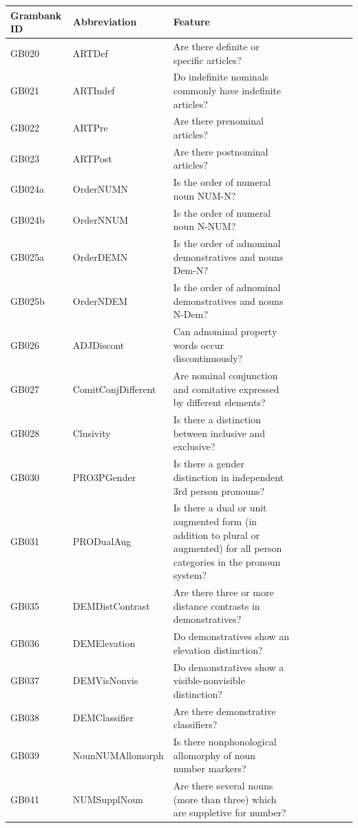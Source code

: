 \documentclass[draft,10pt]{article} %
\begin{document}
\begin{landscape}
\begin{longtable}{| l | p{4cm}| p{12cm}|p{2cm}|p{2cm}|p{2cm}|p{2cm}|p{2cm}|p{2cm}|}
\hline
\textbf{Grambank ID} & \textbf{Abbreviation} & \textbf{Feature}\\ \hline
\endhead
GB020 & ARTDef&Are there definite or specific articles?\\ \hline
GB021 & ARTIndef&Do indefinite nominals commonly have indefinite articles?\\ \hline
GB022 & ARTPre&Are there prenominal articles?\\ \hline
GB023 & ARTPost&Are there postnominal articles?\\ \hline
GB024a & OrderNUMN&Is the order of numeral noun NUM-N?\\ \hline
GB024b & OrderNNUM&Is the order of numeral noun N-NUM?\\ \hline
GB025a & OrderDEMN&Is the order of adnominal demonstratives and nouns Dem-N?\\ \hline
GB025b & OrderNDEM&Is the order of adnominal demonstratives and nouns N-Dem?\\ \hline
GB026 & ADJDiscont&Can adnominal property words occur discontinuously?\\ \hline
GB027 & ComitConjDifferent&Are nominal conjunction and comitative expressed by different elements?\\ \hline
GB028 & Clusivity&Is there a distinction between inclusive and exclusive?\\ \hline
GB030 & PRO3PGender&Is there a gender distinction in independent 3rd person pronouns?\\ \hline
GB031 & PRODualAug&Is there a dual or unit augmented form (in addition to plural or augmented) for all person categories in the pronoun system?\\ \hline
GB035 & DEMDistContrast&Are there three or more distance contrasts in demonstratives?\\ \hline
GB036 & DEMElevation&Do demonstratives show an elevation distinction?\\ \hline
GB037 & DEMVisNonvis&Do demonstratives show a visible-nonvisible distinction?\\ \hline
GB038 & DEMClassifier&Are there demonstrative classifiers?\\ \hline
GB039 & NounNUMAllomorph&Is there nonphonological allomorphy of noun number markers?\\ \hline
GB041 & NUMSupplNoun&Are there several nouns (more than three) which are suppletive for number?\\ \hline

\end{longtable}
\end{landscape}
\end{document}
